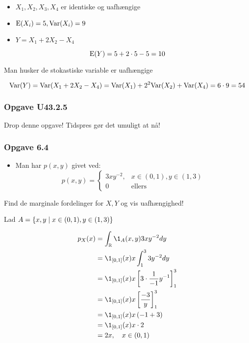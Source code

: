 \begin{itemize}
    \item $X_1, X_2, X_3, X_4$ er identiske og uafhængige
    \item $\text{E}(X_i) = 5, \text{Var}(X_i) =9$
    \item $Y = X_1 + 2X_2 - X_4$
\end{itemize}

\begin{equation}
    \text{E}(Y) = 5 + 2\cdot5 - 5 = 10
\end{equation}

Man husker de stokastiske variable er uafhængige

\begin{equation}
    \text{Var}(Y) = \text{Var}(X_1 + 2X_2 - X_4) = \text{Var}(X_1) + 2^2 \text{Var}(X_2) + \text{Var}(X_4) = 6 \cdot 9 = 54
\end{equation}

\subsubsection{Opgave U43.2.5}

Drop denne opgave! Tidspres gør det umuligt at nå!

\subsubsection{Opgave 6.4}

\begin{itemize}
    \item Man har $p(x,y)$ givet ved:
    \begin{equation}
    p(x,y) = \begin{cases}
        3xy^{-2}, &x \in (0,1), y \in (1,3) \\
        0 &\text{ellers}
    \end{cases}
    \end{equation}
\end{itemize}

Find de marginale fordelinger for $X, Y$ og vis uafhængighed!

Lad $A = \left\{ x,y \mid x\in(0,1), y\in(1,3)\right\}$

\begin{align}
    p_X(x) &= \int_\R \1_A(x,y) 3xy^{-2} dy \\
    &= \1_{[0,1]}(x) x\int_{1}^{3} 3y^{-2} dy \\
    &= \1_{[0,1]}(x) x\lsp 3 \cdot \frac{1}{-1} y^{-1} \rsp_{1}^{3} \\
    &= \1_{[0,1]}(x) x\lsp \frac{-3}{y} \rsp_1^3 \\
    &= \1_{[0,1]}(x) x\lp -1 + 3 \rp\\ 
    &=  \1_{[0,1]}(x) x\cdot 2 \\
    &= 2x, \quad x\in(0,1)
\end{align}


